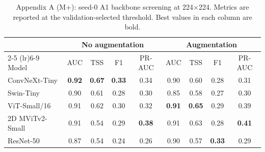 \begin{table}[p]
\centering
\scriptsize
\setlength{\tabcolsep}{4pt}
\caption{Appendix A (M+): seed-0 A1 backbone screening at 224$\times$224. Metrics are reported at the validation-selected threshold. Best values in each column are bold.}
\label{tab:appA_mplus_seed0_grouped}
\begin{tabular}{lcccccccc}
\toprule
& \multicolumn{4}{c}{No augmentation} & \multicolumn{4}{c}{Augmentation} \\
\cmidrule(lr){2-5} \cmidrule(lr){6-9}
Model & AUC & TSS & F1 & PR-AUC & AUC & TSS & F1 & PR-AUC \\
\midrule
ConvNeXt-Tiny & \textbf{0.92} & \textbf{0.67} & \textbf{0.33} & 0.34 & 0.90 & 0.60 & 0.28 & 0.31 \\
Swin-Tiny & 0.90 & 0.61 & 0.28 & 0.30 & 0.85 & 0.58 & 0.27 & 0.30 \\
ViT-Small/16 & 0.91 & 0.62 & 0.30 & 0.32 & \textbf{0.91} & \textbf{0.65} & 0.29 & 0.39 \\
2D MViTv2-Small & 0.91 & 0.54 & 0.29 & \textbf{0.38} & 0.91 & 0.63 & 0.28 & \textbf{0.41} \\
ResNet-50 & 0.87 & 0.54 & 0.24 & 0.26 & 0.90 & 0.57 & \textbf{0.33} & 0.29 \\
\bottomrule
\end{tabular}
\end{table}
